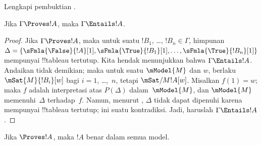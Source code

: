 \documentclass[../../../include/open-logic-section]{subfiles}
\begin{document}
\begin{prob}
Lengkapi pembuktian .
\end{prob}

\begin{cor}
Jika $\Gamma \Proves !A$, maka $\Gamma \Entails !A$.
\end{cor}

\begin{proof}
  Jika $\Gamma \Proves !A$, maka untuk suatu $!B_1$, \dots, $!B_n \in
  \Gamma$, himpunan
  $\Delta = \{\sFmla{\False}{!A}[1], \sFmla{\True}{!B_1}[1],
  \dots, \sFmla{\True}{!B_n}[1]\}$ mempunyai !!{tableau} tertutup. Kita
  hendak menunjukkan bahwa $\Gamma \Entails !A$. Andaikan tidak demikian;
  maka untuk suatu $\mModel{M}$ dan $w$, berlaku
  $\mSat{M}{!B_i}[w]$ bagi $i=1$, \dots,~$n$, tetapi
  $\mSat/{M}{!A}[w]$. Misalkan $f(1) = w$; maka $f$ adalah interpretasi atas
  $P(\Delta)$ dalam~$\mModel{M}$, dan $\mModel{M}$ memenuhi~$\Delta$
  terhadap~$f$. Namun, menurut , $\Delta$
  tidak dapat dipenuhi karena mempunyai !!{tableau} tertutup; ini suatu
  kontradiksi. Jadi, haruslah $\Gamma \Entails !A$.
\end{proof}

\begin{cor}
Jika $\Proves !A$, maka $!A$ benar dalam semua model.
\end{cor}
\end{document}
